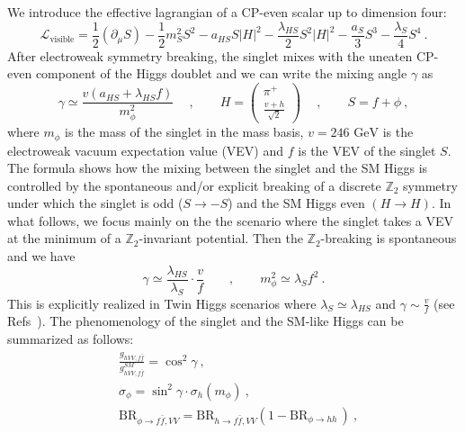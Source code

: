 We introduce the effective lagrangian of a CP-even scalar up to dimension four:
\begin{equation}
\mathcal{L}_{\text{visible}}=\frac{1}{2}(\partial_\mu S)-\frac{1}{2} m_S^2 S^2-a_{HS} S\vert H\vert^2-\frac{\lambda_{HS}}{2} S^2\vert H\vert^2-\frac{a_S}{3} S^3-\frac{\lambda_S}{4} S^4\ .\label{eq:everybody}
\end{equation}
After electroweak symmetry breaking, the singlet mixes with the uneaten CP-even component of the Higgs doublet and we can write the mixing angle $\gamma$ as
\begin{equation}
\gamma\simeq\frac{v(a_{HS}+\lambda_{HS} f)}{m_\phi^2}\quad\ ,\qquad H=\begin{pmatrix}\pi^+\\ \frac{v+h}{\sqrt{2}}\end{pmatrix}\quad\ ,\qquad S=f+\phi\ ,
\end{equation}   
where $m_\phi$ is the mass of the singlet in the mass basis, $v=246\text{ GeV}$ is the electroweak vacuum expectation value (VEV) and $f$ is the VEV of the singlet $S$. The formula shows how the mixing between the singlet and the SM Higgs is controlled by the spontaneous and/or explicit breaking of a discrete $\mathbb{Z}_2$ symmetry under which the singlet is odd ($S\to -S$) and the SM Higgs even $(H\to H)$.  In what follows, we focus mainly on the the scenario where the singlet takes a VEV at the minimum of a $\mathbb{Z}_2$-invariant potential. Then the $\mathbb{Z}_2$-breaking is spontaneous and we have
\begin{equation}
\gamma\simeq \frac{\lambda_{HS}}{\lambda_S}\cdot\frac{v}{f}\qquad ,\qquad m_\phi^2\simeq \lambda_S f^2\ . \label{eq:mixing}
\end{equation} 
 This is explicitly realized in Twin Higgs scenarios where $\lambda_S\simeq \lambda_{HS}$ and $\gamma\sim \frac{v}{f}$ (see Refs~\cite{Chacko:2005pe,Barbieri:2005ri}). The phenomenology of the singlet and the SM-like Higgs can be summarized as follows:
\begin{align}
&\frac{g_{hVV,f\bar f}}{g_{hVV,f\bar f}^{SM}}=\cos^2\gamma \label{eq:SMHiggs}\ ,\\
&\sigma_\phi=\sin^2\gamma\cdot \sigma_{h}(m_\phi)\label{eq:Sproduction}\ ,\\
&\text{BR}_{\phi\to f\bar{f},VV}=\text{BR}_{h\to f\bar{f},VV}(1-\text{BR}_{\phi\to hh\ \label{eq:SBR}
})\ ,
\end{align}
